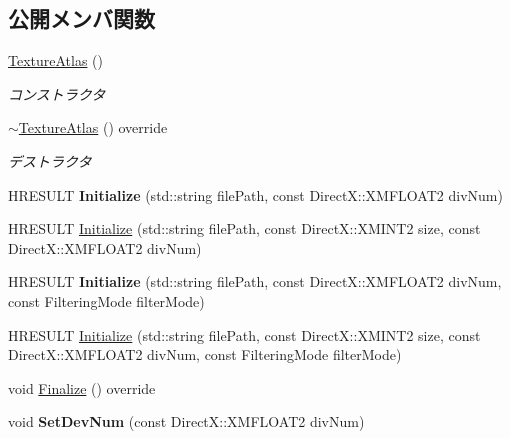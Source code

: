 \subsection*{公開メンバ関数}
\begin{DoxyCompactItemize}
\item 
\hyperlink{class_a_p_i_1_1_texture_atlas_a200db7ac91cea63c9f454a01780b68df}{Texture\+Atlas} ()
\begin{DoxyCompactList}\small\item\em コンストラクタ \end{DoxyCompactList}\item 
\hyperlink{class_a_p_i_1_1_texture_atlas_afb13a479220b34cb7399c2f9be06336a}{$\sim$\+Texture\+Atlas} () override
\begin{DoxyCompactList}\small\item\em デストラクタ \end{DoxyCompactList}\item 
H\+R\+E\+S\+U\+LT {\bfseries Initialize} (std\+::string file\+Path, const Direct\+X\+::\+X\+M\+F\+L\+O\+A\+T2 div\+Num)\hypertarget{class_a_p_i_1_1_texture_atlas_ac9d8323342b75d22e90a27ed4cdc49e7}{}\label{class_a_p_i_1_1_texture_atlas_ac9d8323342b75d22e90a27ed4cdc49e7}

\item 
H\+R\+E\+S\+U\+LT \hyperlink{class_a_p_i_1_1_texture_atlas_a31953216d036affed2f1f601d99a269f}{Initialize} (std\+::string file\+Path, const Direct\+X\+::\+X\+M\+I\+N\+T2 size, const Direct\+X\+::\+X\+M\+F\+L\+O\+A\+T2 div\+Num)
\item 
H\+R\+E\+S\+U\+LT {\bfseries Initialize} (std\+::string file\+Path, const Direct\+X\+::\+X\+M\+F\+L\+O\+A\+T2 div\+Num, const Filtering\+Mode filter\+Mode)\hypertarget{class_a_p_i_1_1_texture_atlas_a828dcc3d5825d3f915e0383fe872ce5f}{}\label{class_a_p_i_1_1_texture_atlas_a828dcc3d5825d3f915e0383fe872ce5f}

\item 
H\+R\+E\+S\+U\+LT \hyperlink{class_a_p_i_1_1_texture_atlas_ae9b214a35ca6e19e83727006147c73cf}{Initialize} (std\+::string file\+Path, const Direct\+X\+::\+X\+M\+I\+N\+T2 size, const Direct\+X\+::\+X\+M\+F\+L\+O\+A\+T2 div\+Num, const Filtering\+Mode filter\+Mode)
\item 
void \hyperlink{class_a_p_i_1_1_texture_atlas_aadf4b965bdac3ac366a8fbe876509fcb}{Finalize} () override
\item 
void {\bfseries Set\+Dev\+Num} (const Direct\+X\+::\+X\+M\+F\+L\+O\+A\+T2 div\+Num)\hypertarget{class_a_p_i_1_1_texture_atlas_a6eea55cb7fee63b28622bf3bde439570}{}\label{class_a_p_i_1_1_texture_atlas_a6eea55cb7fee63b28622bf3bde439570}


\end{DoxyCompactItemize}
